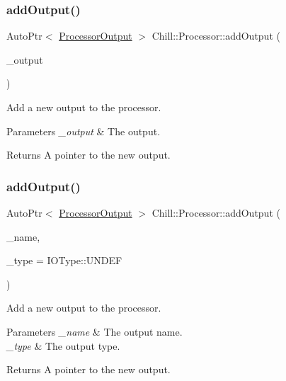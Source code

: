 \subsubsection{\texorpdfstring{add\+Output()}{addOutput()}\hspace{0.1cm}{\footnotesize\ttfamily [1/2]}}
{\footnotesize\ttfamily Auto\+Ptr$<$ \mbox{\hyperlink{class_chill_1_1_processor_output}{Processor\+Output}} $>$ Chill\+::\+Processor\+::add\+Output (\begin{DoxyParamCaption}\item[{Auto\+Ptr$<$ \mbox{\hyperlink{class_chill_1_1_processor_output}{Processor\+Output}} $>$}]{\+\_\+output }\end{DoxyParamCaption})}

Add a new output to the processor. 
\begin{DoxyParams}{Parameters}
{\em \+\_\+output} & The output. \\
\hline
\end{DoxyParams}
\begin{DoxyReturn}{Returns}
A pointer to the new output. 
\end{DoxyReturn}
\mbox{\label{class_chill_1_1_processor_a2bb867802937d84cb94941ebbbf43ff8}} 
\subsubsection{\texorpdfstring{add\+Output()}{addOutput()}\hspace{0.1cm}{\footnotesize\ttfamily [2/2]}}
{\footnotesize\ttfamily Auto\+Ptr$<$ \mbox{\hyperlink{class_chill_1_1_processor_output}{Processor\+Output}} $>$ Chill\+::\+Processor\+::add\+Output (\begin{DoxyParamCaption}\item[{std\+::string}]{\+\_\+name,  }\item[{I\+O\+Type\+::\+I\+O\+Type}]{\+\_\+type = {\ttfamily IOType\+:\+:UNDEF} }\end{DoxyParamCaption})}

Add a new output to the processor. 
\begin{DoxyParams}{Parameters}
{\em \+\_\+name} & The output name. \\
\hline
{\em \+\_\+type} & The output type. \\
\hline
\end{DoxyParams}
\begin{DoxyReturn}{Returns}
A pointer to the new output. 
\end{DoxyReturn}
\mbox{\label{class_chill_1_1_processor_a2eb86d9750e1c0d5ac7f6da166aca8fd}} 

